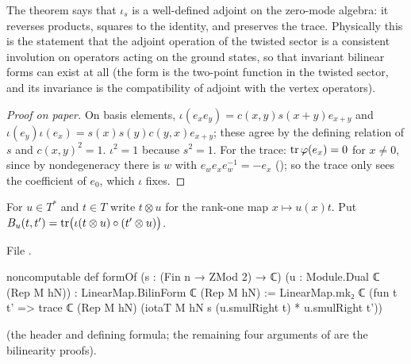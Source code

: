 \begin{physics}
The theorem says that $\iota_s$ is a well-defined adjoint on the zero-mode algebra: it reverses products, squares to the identity, and preserves the trace. Physically this is the statement that the adjoint operation of the twisted sector is a consistent involution on operators acting on the ground states, so that invariant bilinear forms can exist at all (the form is the two-point function in the twisted sector, and its invariance is the compatibility of adjoint with the vertex operators).
\end{physics}
\begin{proof}[Proof on paper]
On basis elements, $\iota(e_xe_y)=c(x,y)s(x+y)e_{x+y}$ and
$\iota(e_y)\iota(e_x)=s(x)s(y)c(y,x)e_{x+y}$; these agree by the defining relation of $s$ and
$c(x,y)^2=1$.  $\iota^2=1$ because $s^2=1$.  For the trace: $\operatorname{tr}\varphi(e_x)=0$ for $x\ne0$, since
by nondegeneracy there is $w$ with $e_we_xe_w^{-1}=-e_x$ (); so the trace
only sees the coefficient of $e_0$, which $\iota$ fixes.
\end{proof}

\begin{definition}\label{ch06:def:formOf}
For $u\in T^*$ and $t\in T$ write $t\otimes u$ for the rank-one map $x\mapsto u(x)t$.  Put
$B_u(t,t')=\operatorname{tr}\bigl(\iota(t\otimes u)\circ(t'\otimes u)\bigr)$.
\end{definition}
\noindent File .
\begin{leancode}
noncomputable def formOf (s : (Fin n → ZMod 2) → ℂ) (u : Module.Dual ℂ (Rep M hN)) :
    LinearMap.BilinForm ℂ (Rep M hN) :=
  LinearMap.mk₂ ℂ
    (fun t t' => trace ℂ (Rep M hN) (iotaT M hN s (u.smulRight t) * u.smulRight t'))
\end{leancode}
(the header and defining formula; the remaining four arguments of  are the
bilinearity proofs).

